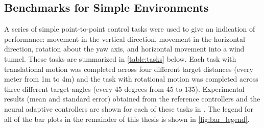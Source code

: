 \documentclass[letterpaper,12pt,titlepage,oneside,final]{book}
\begin{document}
\subsection{Benchmarks for Simple Environments}

A series of simple point-to-point control tasks were used to give an indication of performance:  movement in the vertical direction, movement in the horizontal direction, rotation about the yaw axis, and horizontal movement into a wind tunnel. %
These tasks are summarized in \autoref{table:tasks} below.
Each task with translational motion was completed across four different target distances (every meter from 1m to 4m) and the task with rotational motion was completed across three different target angles (every 45 degrees from 45{\degree} to 135{\degree}).
Experimental results (mean and standard error) obtained from the reference controllers and the neural adaptive controllers are shown for each of these tasks in .
The legend for all of the bar plots in the remainder of this thesis is shown in \autoref{fig:bar_legend}.
 

\end{document}
